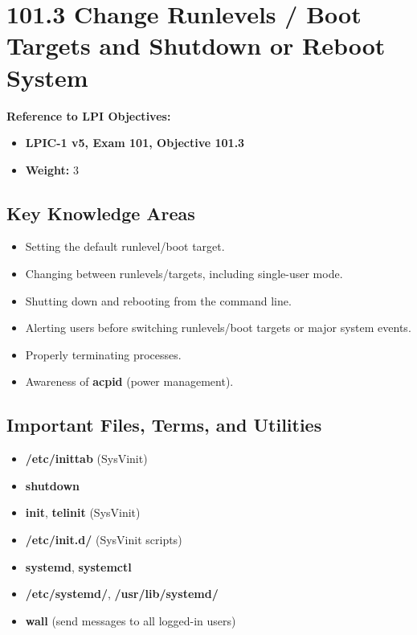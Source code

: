 \documentclass[12pt,a4paper]{report}
\begin{document}

\section*{101.3 Change Runlevels / Boot Targets and Shutdown or Reboot System}

\textbf{Reference to LPI Objectives:}  
\begin{itemize}
    \item \textbf{LPIC-1 v5, Exam 101, Objective 101.3}
    \item \textbf{Weight:} 3
\end{itemize}

\subsection*{Key Knowledge Areas}
\begin{itemize}
    \item Setting the default runlevel/boot target.
    \item Changing between runlevels/targets, including single-user mode.
    \item Shutting down and rebooting from the command line.
    \item Alerting users before switching runlevels/boot targets or major system events.
    \item Properly terminating processes.
    \item Awareness of \textbf{acpid} (power management).
\end{itemize}

\subsection*{Important Files, Terms, and Utilities}
\begin{itemize}
    \item \textbf{/etc/inittab} (SysVinit)
    \item \textbf{shutdown}
    \item \textbf{init}, \textbf{telinit} (SysVinit)
    \item \textbf{/etc/init.d/} (SysVinit scripts)
    \item \textbf{systemd}, \textbf{systemctl}
    \item \textbf{/etc/systemd/}, \textbf{/usr/lib/systemd/}
    \item \textbf{wall} (send messages to all logged-in users)
\end{itemize}
\end{document}
